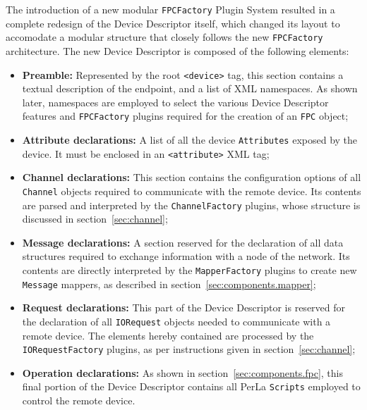 The introduction of a new modular \texttt{FPCFactory} Plugin System resulted in
a complete redesign of the Device Descriptor itself, which changed its layout
to accomodate a modular structure that closely follows the new
\texttt{FPCFactory} architecture. The new Device Descriptor is composed of the
following elements:

\begin{itemize}

    \item \textbf{Preamble:} Represented by the root \lstinline!<device>! tag,
        this section contains a textual description of the endpoint, and a list
        of XML namespaces. As shown later, namespaces are employed to select
        the various Device Descriptor features and \texttt{FPCFactory} plugins
        required for the creation of an \texttt{FPC} object;

    \item \textbf{Attribute declarations:} A list of all the device
        \texttt{Attributes} exposed by the device. It must be enclosed in an
        \lstinline!<attribute>! XML tag;

    \item \textbf{Channel declarations:} This section contains the
        configuration options of all \texttt{Channel} objects required to
        communicate with the remote device. Its contents are parsed and
        interpreted by the \texttt{ChannelFactory} plugins, whose structure is
        discussed in section~\ref{sec:channel};

    \item \textbf{Message declarations:} A section reserved for the declaration
        of all data structures required to exchange information with a node of
        the network. Its contents are directly interpreted by the
        \texttt{MapperFactory} plugins to create new \texttt{Message}
        mappers, as described in section~\ref{sec:components.mapper};

    \item \textbf{Request declarations:} This part of the Device Descriptor is
        reserved for the declaration of all \texttt{IORequest} objects needed
        to communicate with a remote device. The elements hereby contained are
        processed by the \texttt{IORequestFactory} plugins, as per instructions
        given in section~\ref{sec:channel};

    \item \textbf{Operation declarations:} As shown in
        section~\ref{sec:components.fpc}, this final portion of the Device
        Descriptor contains all PerLa \texttt{Scripts} employed to control the
        remote device.

\end{itemize}

